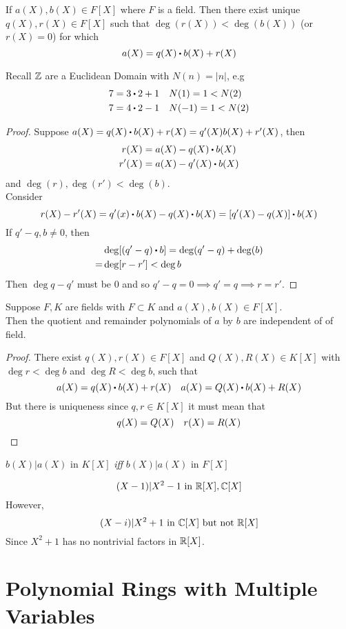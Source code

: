 \documentclass[../Main.tex]{subfiles}
\begin{document}
\begin{thm}[title = \texorpdfstring{$F[X]$}{F[X]} satisfies euclidean condition]
	If $a(X),b(X)\in F[X]$ where $F$ is a field. Then there exist unique $q(X),r(X)\in F[X]$ such that $\deg (r(X)) < \deg (b(X))$ (or $r(X)=0$) for which \[a(X)=q(X)\rdot b(X)+r(X)\]
\end{thm}
\Note Recall $\mathbb{Z}$ are a Euclidean Domain with $N(n)=|n|$, e.g
\begin{align*}
7=3\rdot 2+1&\quad N(1)=1<N(2)\\
7=4\rdot 2-1&\quad N(-1)=1<N(2)
\end{align*}
\begin{proof}
	Suppose $a(X)=q(X)\rdot b(X)+r(X)=q'(X)b(X)+r'(X)$, then
	\begin{align*}
	r(X)&=a(X)-q(X)\rdot b(X)\\
	r'(X)&=a(X)-q'(X)\rdot b(X)
	\end{align*}
	and $\deg(r),\deg(r')<\deg(b)$.\\
	Consider
	\[r(X)-r'(X)=q'(x)\rdot b(X)-q(X)\rdot b(X) = [q'(X)-q(X)]\rdot b(X)\]
	If $q'-q,b\ne 0$, then 
	\begin{align*}
	&\deg[(q'-q)\rdot b]=\deg(q'-q)+\deg(b)\\
	=&\deg[r-r']<\deg b
	\end{align*}
	Then $\deg{q-q'}$ must be $0$ and so $q'-q=0\implies q'=q\implies r=r'$.
\end{proof}
\begin{crl}[title = ]
	Suppose $F,K$ are fields with $F\subset K$ and $a(X),b(X)\in F[X]$. \\
	Then the quotient and remainder polynomials of $a$ by $b$ are independent of of field.
\end{crl}
\begin{proof}
	There exist $q(X),r(X)\in F[X]$ and $Q(X), R(X)\in K[X]$ with $\deg r< \deg b$ and $\deg R< \deg b$, such that
	\[a(X)=q(X)\rdot b(X)+r(X)\quad a(X)=Q(X)\rdot b(X)+R(X)\]
	But there is uniqueness since $q,r\in K[X]$ it must mean that
	\[q(X)=Q(X)\quad r(X)=R(X)\qedhere\]
\end{proof}
\begin{crl}
	$b(X)|a(X)$ in $K[X]$ \textit{iff} $b(X)|a(X)$ in $F[X]$
\end{crl}
\begin{example}
	\[(X-1)|X^2-1 \text{ in } \mathbb{R}[X],\mathbb{C}[X]\]
	However,
	\[(X-i)| X^2+1 \text{ in } \mathbb{C}[X] \text{ but not } \mathbb{R}[X]\]
	Since $X^2+1$ has no nontrivial factors in $\mathbb{R}[X]$.
\end{example}
\section*{Polynomial Rings with Multiple Variables}
\end{document}
